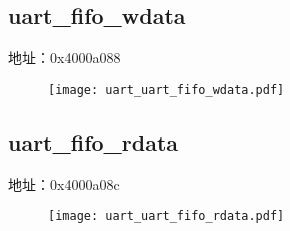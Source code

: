 \subsection{uart\_fifo\_wdata}
\label{uart-uart-fifo-wdata}
地址：0x4000a088
 \begin{figure}[H]
\texttt{[image: uart\_uart\_fifo\_wdata.pdf]}
\end{figure}

\subsection{uart\_fifo\_rdata}
\label{uart-uart-fifo-rdata}
地址：0x4000a08c
 \begin{figure}[H]
\texttt{[image: uart\_uart\_fifo\_rdata.pdf]}
\end{figure}

